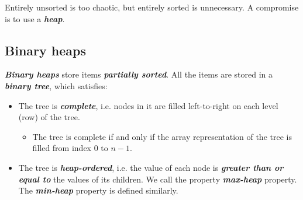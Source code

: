 \documentclass[12pt,a4paper]{ctexart}
\newcommand{\highlight}[1]{\textbf{\textit{#1}}}
\begin{document}
    Entirely unsorted is too chaotic, but entirely sorted is unnecessary. A compromise is to use a \highlight{heap}.

    \subsection{Binary heaps}

    \highlight{Binary heaps} store items \highlight{partially sorted}. All the items are stored in a \highlight{binary tree}, which satisfies:
    \begin{itemize}
        \item The tree is \highlight{complete}, i.e. nodes in it are filled left-to-right on each level (row) of the tree.
        \begin{itemize}[left=1em]
            \item The tree is complete if and only if the array representation of the tree is filled from index 0 to $n-1$.
        \end{itemize}
        \item The tree is \highlight{heap-ordered}, i.e. the value of each node is \highlight{greater than or equal to} the values of its children. We call the property \highlight{max-heap} property. The \highlight{min-heap} property is defined similarly.
    \end{itemize}
\end{document}
